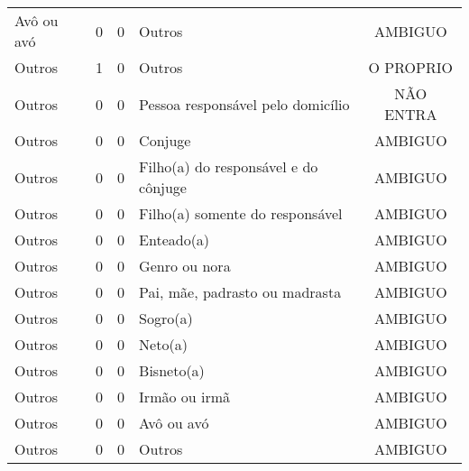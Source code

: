 \documentclass[
	12pt,				%
	openright,			%
	twoside,			%
	a4paper,			%
	english,			%
	french,				%
	spanish,			%
	brazil				%
	]{abntex2}
\begin{document}
\begin{anexosenv}
\begin{longtable}{@{}lcclc@{}}
				Avô ou avó & 0 & 0 & Outros & AMBIGUO \\
				Outros & 1 & 0 & Outros & O PROPRIO \\
				Outros & 0 & 0 & Pessoa responsável pelo domicílio & NÃO ENTRA \\
				Outros & 0 & 0 & Conjuge & AMBIGUO \\
				Outros & 0 & 0 & Filho(a) do responsável e do cônjuge & AMBIGUO \\
				Outros & 0 & 0 & Filho(a) somente do responsável & AMBIGUO \\
				Outros & 0 & 0 & Enteado(a) & AMBIGUO \\
				Outros & 0 & 0 & Genro ou nora & AMBIGUO \\
				Outros & 0 & 0 & Pai, mãe, padrasto ou madrasta & AMBIGUO \\
				Outros & 0 & 0 & Sogro(a) & AMBIGUO \\
				Outros & 0 & 0 & Neto(a) & AMBIGUO \\
				Outros & 0 & 0 & Bisneto(a) & AMBIGUO \\
				Outros & 0 & 0 & Irmão ou irmã & AMBIGUO \\
				Outros & 0 & 0 & Avô ou avó & AMBIGUO \\
				Outros & 0 & 0 & Outros & AMBIGUO \\ \bottomrule
\end{longtable}
	
	
\end{anexosenv}


\printindex
\end{document}
